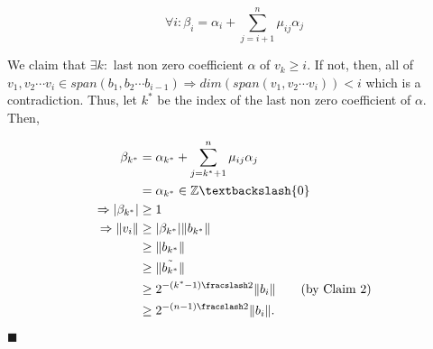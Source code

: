 \[
\forall i: \beta_i = \alpha_i + \sum_{j=i+1}^n \mu_{ij} \alpha_j
\]

We claim that $\exists k: $ last non zero coefficient $\alpha$ of $v_k \ge i$. If not, then,
all of $v_1, v_2 \cdots v_i \in span(b_1, b_2 \cdots b_{i-1}) \Rightarrow dim(span(v_1, v_2 \cdots v_i)) < i$ which is a contradiction. 
Thus, let $k^*$ be the index of the last non zero coefficient of $\alpha$. Then,

\begin{align*}
    \beta_{k^*} &= \alpha_{k^*} + \sum_{j = k^* + 1}^n \mu_{ij} \alpha_j \\
    &= \alpha_{k^*} \in \Z \textbackslash \{0\} \\
    \Rightarrow \lvert \beta_{k^*} \rvert &\ge 1 \\
    \Rightarrow \lVert v_i \rVert &\ge \lvert \beta_{k^*} \rvert \lVert b_{k^*} \rVert \\
    &\ge \lVert b_{k^*} \rVert \\
    &\ge \lVert \Tilde{b_{k^*}} \rVert \\
    &\ge 2^{-(k^*-1) \fracslash 2} \lVert b_i \rVert \tag{by Claim 2}\\
    &\ge 2^{-(n-1) \fracslash 2} \lVert b_i \rVert.
\end{align*}

\hfill$\blacksquare$
